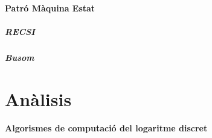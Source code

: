 \documentclass{article}
\begin{document}
\subsection{Patró Màquina Estat}
\subsubsection{RECSI}
\subsubsection{Busom}
\part{Anàlisis}\label{part:analisis}
\subsection{Algorismes de computació del logaritme discret}



\end{document}
